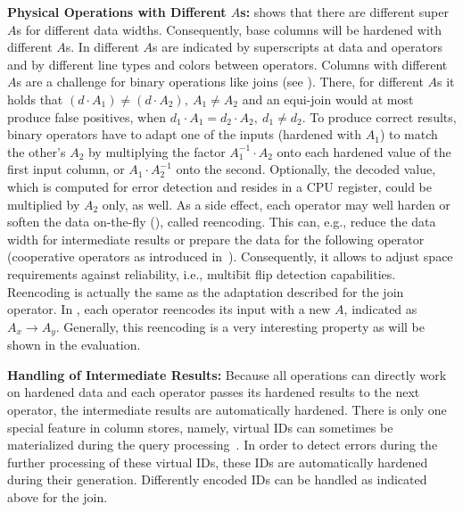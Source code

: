 
\textbf{Physical Operations with Different \(A\)s:}
 shows that there are different super \(A\)s for different data widths. Consequently, base columns will be hardened with different \(A\)s. In  different \(A\)s are indicated by superscripts at data and operators and by different line types and colors between operators. Columns with different \(A\)s are a challenge for binary operations like joins (see ). There, for different \(A\)s it holds that \((d \cdot A_1) \neq (d \cdot A_2), ~ A_1 \neq A_2\) and an equi-join would at most produce false positives, when \(d_1\cdot A_1=d_2\cdot A_2, ~ d_1 \neq d_2\). To produce correct results, binary operators have to adapt one of the inputs (hardened with \(A_1\)) to match the other's \(A_2\) by multiplying the factor \(A_1^{-1}\cdot A_2\) onto each hardened value of the first input column, or \(A_1\cdot A_2^{-1}\) onto the second. Optionally, the decoded value, which is computed for error detection and resides in a CPU register, could be multiplied by \(A_2\) only, as well. As a side effect, each operator may well harden or soften the data on-the-fly (), called reencoding. This can, e.g., reduce the data width for intermediate results or prepare the data for the following operator (cooperative operators as introduced in~\cite{DBLP:conf/cidr/KissingerSHL13}). Consequently, it allows to adjust space requirements against reliability, i.e., multi\=bit flip detection capabilities. Reencoding is actually the same as the adaptation described for the join operator. In , each operator reencodes its input with a new \(A\), indicated as \(A_x\rightarrow A_y\). Generally, this reencoding is a very interesting property as will be shown in the evaluation. 



\textbf{Handling of Intermediate Results:}
Because all operations can directly work on hardened data and each operator passes its hardened results to the next operator, the intermediate results are automatically hardened. There is only one special feature in column stores, namely, virtual IDs can sometimes be materialized during the query processing~\cite{DBLP:journals/ftdb/AbadiBHIM13,DBLP:journals/debu/IdreosGNMMK12}. In order to detect errors during the further processing of these virtual IDs, these IDs are automatically hardened during their generation. Differently encoded IDs can be handled as indicated above for the join.

